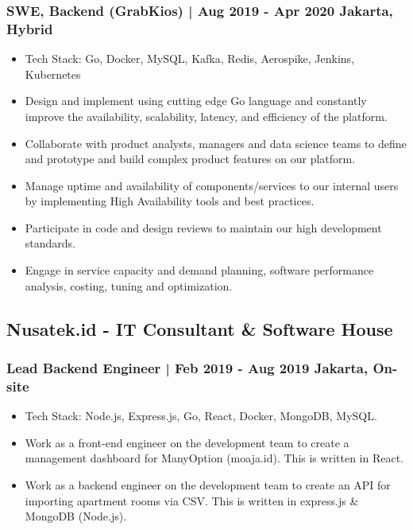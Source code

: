 \documentclass[11pt]{article}
\begin{document}
\subsubsection{SWE, Backend (GrabKios) | Aug 2019 - Apr 2020 \hfill Jakarta, Hybrid}
\begin{itemize}
    \item Tech Stack: Go, Docker, MySQL, Kafka, Redis, Aerospike, Jenkins, Kubernetes
    \item Design and implement using cutting edge Go language and constantly improve the availability,
          scalability, latency, and efficiency of the platform.
    \item Collaborate with product analysts, managers and data science teams to define and prototype and
          build complex product features on our platform.
    \item Manage uptime and availability of components/services to our internal users by implementing High
          Availability tools and best practices.
    \item Participate in code and design reviews to maintain our high development standards.
    \item Engage in service capacity and demand planning, software performance analysis, costing, tuning
          and optimization.
\end{itemize}

\subsection{Nusatek.id - IT Consultant \& Software House}
\subsubsection{Lead Backend Engineer | Feb 2019 - Aug 2019 \hfill Jakarta, On-site}
\begin{itemize}
    \item Tech Stack: Node.js, Express.js, Go, React, Docker, MongoDB, MySQL.
    \item Work as a front-end engineer on the development team to create a management dashboard for ManyOption (moaja.id). This is written in React.
    \item Work as a backend engineer on the development team to create an API for importing apartment rooms via CSV. This is written in express.js \& MongoDB (Node.js).
\end{itemize}
\end{document}
